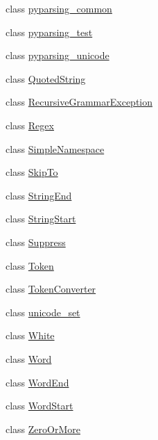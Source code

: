 \begin{DoxyCompactItemize}
class \hyperlink{classpyparsing_1_1pyparsing__common}{pyparsing\+\_\+common}
\item 
class \hyperlink{classpyparsing_1_1pyparsing__test}{pyparsing\+\_\+test}
\item 
class \hyperlink{classpyparsing_1_1pyparsing__unicode}{pyparsing\+\_\+unicode}
\item 
class \hyperlink{classpyparsing_1_1QuotedString}{Quoted\+String}
\item 
class \hyperlink{classpyparsing_1_1RecursiveGrammarException}{Recursive\+Grammar\+Exception}
\item 
class \hyperlink{classpyparsing_1_1Regex}{Regex}
\item 
class \hyperlink{classpyparsing_1_1SimpleNamespace}{Simple\+Namespace}
\item 
class \hyperlink{classpyparsing_1_1SkipTo}{Skip\+To}
\item 
class \hyperlink{classpyparsing_1_1StringEnd}{String\+End}
\item 
class \hyperlink{classpyparsing_1_1StringStart}{String\+Start}
\item 
class \hyperlink{classpyparsing_1_1Suppress}{Suppress}
\item 
class \hyperlink{classpyparsing_1_1Token}{Token}
\item 
class \hyperlink{classpyparsing_1_1TokenConverter}{Token\+Converter}
\item 
class \hyperlink{classpyparsing_1_1unicode__set}{unicode\+\_\+set}
\item 
class \hyperlink{classpyparsing_1_1White}{White}
\item 
class \hyperlink{classpyparsing_1_1Word}{Word}
\item 
class \hyperlink{classpyparsing_1_1WordEnd}{Word\+End}
\item 
class \hyperlink{classpyparsing_1_1WordStart}{Word\+Start}
\item 
class \hyperlink{classpyparsing_1_1ZeroOrMore}{Zero\+Or\+More}
\end{DoxyCompactItemize}
